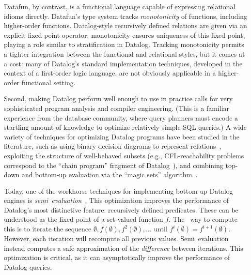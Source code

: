 
Datafun, by contrast, is a functional language capable of expressing relational
idioms directly.
%
Datafun's type system tracks \emph{monotonicity} of functions, including
higher-order functions.
%
Datalog-style recursively defined relations are given via an explicit fixed
point operator; monotonicity ensures uniqueness of this fixed point, playing a
role similar to stratification in Datalog.
%
Tracking monotonicity permits a tighter integration between the functional and
relational styles, but it comes at a cost: many of Datalog's standard
implementation techniques, developed in the context of a first-order logic
language, are not obviously applicable in a higher-order functional setting.

Second, making Datalog perform well enough to use in practice calls for very
sophisticated program analysis and compiler engineering. (This is a familiar
experience from the database community, where query planners must encode a
startling amount of knowledge to optimize relatively simple SQL queries.) A wide
variety of techniques for optimizing Datalog programs have been studied in the
literature, such as using binary decision diagrams to represent
relations~\cite{whaley-phd}, exploiting the structure of well-behaved subsets
(e.g., CFL-reachability problems correspond to the ``chain program'' fragment of
Datalog~\cite{chain-programs}), and combining top-down and bottom-up evaluation
via the ``magic sets'' algorithm~\cite{magic-sets}.

Today, one of the workhorse techniques for implementing bottom-up
Datalog engines is \emph{semi\naive\ evaluation}~\cite{seminaive}.
This optimization improves the performance of Datalog's most
distinctive feature: recursively defined predicates. These can be
understood as the fixed point of a set-valued function $f$. The
\naive\ way to compute this is to iterate the sequence $\emptyset,
f(\emptyset), f^2(\emptyset), \dots$ until $f^i(\emptyset) =
f^{i+1}(\emptyset)$. However, each iteration will recompute all
previous values. Semi\naive\ evaluation instead computes a safe
approximation of the \emph{difference} between iterations. This
optimization is critical, as it can asymptotically improve the
performance of Datalog queries.

